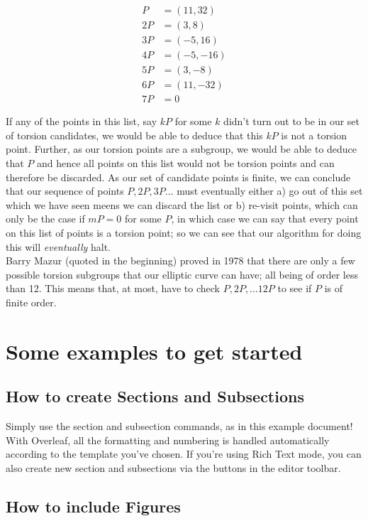 \documentclass{article}
\begin{document}
\begin{align*} 
P &= (11, 32)\\
2P &= (3, 8)\\
3P &= (-5, 16)\\
4P &= (-5, -16)\\
5P &= (3, -8)\\
6P &= (11, -32)\\
7P &= 0
\end{align*} 

If any of the points in this list, say $kP$ for some $k$ didn't turn out to be in our set of torsion candidates, we would be able to deduce that this $kP$ is not a torsion point. Further, as our torsion points are a subgroup, we would be able to deduce that $P$ and hence all points on this list would not be torsion points and can therefore be discarded. As our set of candidate points is finite, we can conclude that our sequence of points $P, 2P, 3P \dots$ must eventually either a) go out of this set which we have seen meens we can discard the list or b) re-visit points, which can only be the case if $mP = 0$ for some $P$, in which case we can say that every point on this list of points is a torsion point; so we can see that our algorithm for doing this will \emph{eventually} halt.\\

Barry Mazur (quoted in the beginning) proved in 1978 that there are only a few possible torsion subgroups that our elliptic curve can have; all being of order less than 12. This means that, at most, have to check $P, 2P, ... 12P$ to see if $P$ is of finite order.

\newpage

\section{Some examples to get started}

\subsection{How to create Sections and Subsections}

Simply use the section and subsection commands, as in this example document! With Overleaf, all the formatting and numbering is handled automatically according to the template you've chosen. If you're using Rich Text mode, you can also create new section and subsections via the buttons in the editor toolbar.

\subsection{How to include Figures}
\end{document}
